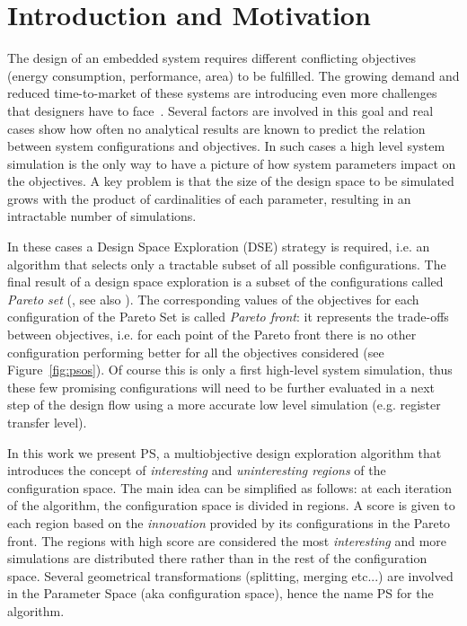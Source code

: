
\section{Introduction and Motivation}

The design of an embedded system requires different conflicting
objectives (energy consumption, performance, area) to be fulfilled.
The growing demand and reduced time-to-market of these systems are
introducing even more challenges that designers have to
face~\cite{wsts}.
Several factors are involved in this goal and real cases show how
often no analytical results are known to predict the relation between
system configurations and objectives. In such cases a high level
system simulation is the only way to have a picture of how system
parameters impact on the objectives.  A key problem is that the size
of the design space to be simulated grows with the product of
cardinalities of each parameter, resulting in an intractable number
of simulations. 

In these cases a Design Space
Exploration (DSE) strategy is required, i.e. an algorithm that selects
only a tractable subset of all possible configurations.
The final result of a design space exploration is a subset of the
configurations called \emph{Pareto set} (\cite{pareto}, see also
). The corresponding values of the objectives for
each configuration of the Pareto Set is called \emph{Pareto front}:
it represents the trade-offs between objectives, i.e.  for each point
of the Pareto front there is no other configuration performing better
for all the objectives considered (see Figure~\ref{fig:psos}). Of course this is only a first
high-level system simulation, thus these few promising
configurations will need to be further evaluated in a next step of the design
flow using a more accurate low level simulation (e.g. register
transfer level).



In this work we present PS, a multiobjective design exploration
algorithm that introduces the concept of \emph{interesting} and
\emph{uninteresting regions} of the configuration space.  The main
idea can be simplified as follows: at each iteration of the algorithm,
the configuration space is divided in regions. A score is given to
each region based on the \emph{innovation} provided by its
configurations in the Pareto front. The regions with high score are
considered the most \emph{interesting} and more simulations are
distributed there rather than in the rest of the configuration space.
Several geometrical transformations (splitting, merging etc...) are
involved in the Parameter Space (aka configuration space), hence
the name PS for the algorithm.

